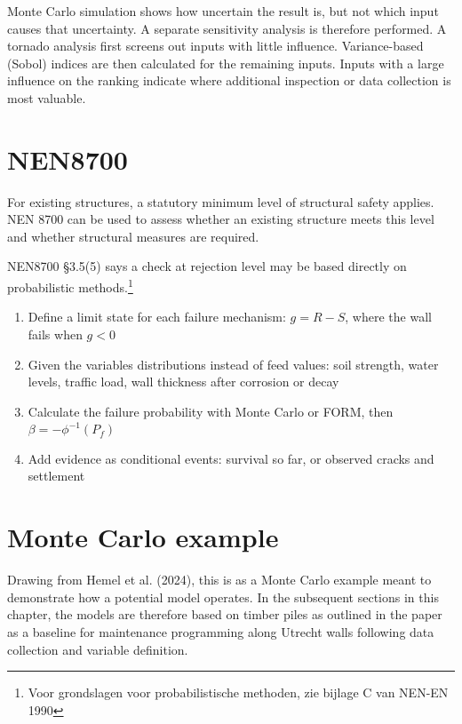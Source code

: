 Monte Carlo simulation shows how uncertain the result is, but not which input causes that uncertainty. A separate sensitivity analysis is therefore performed. A tornado analysis first screens out inputs with little influence. Variance-based (Sobol) indices are then calculated for the remaining inputs. Inputs with a large influence on the ranking indicate where additional inspection or data collection is most valuable.

\section{NEN8700}
For existing structures, a statutory minimum level of structural safety applies. NEN 8700 can be used to assess whether an existing structure meets this level and whether structural measures are required. 

NEN8700 §3.5(5) says a check at rejection level may be based directly on probabilistic methods.\footnote{Voor grondslagen voor probabilistische methoden, zie bijlage C van NEN-EN 1990}
\begin{enumerate}
    \item Define a limit state for each failure mechanism: $g=R-S$, where the wall fails when $g < 0 $
    \item Given the variables distributions instead of feed values: soil strength, water levels, traffic load, wall thickness after corrosion or decay
    \item Calculate the failure probability with Monte Carlo or FORM, then \(\beta = -\phi^{-1}(P_f) \)
    \item Add evidence as conditional events: survival so far, or observed cracks and settlement
\end{enumerate}


\section{Monte Carlo example}

Drawing from Hemel et al. (2024), this is as a Monte Carlo example meant to demonstrate how a potential model operates. In the subsequent sections in this chapter, the models are therefore based on timber piles as outlined in the paper as a baseline for maintenance programming along Utrecht walls following data collection and variable definition.


